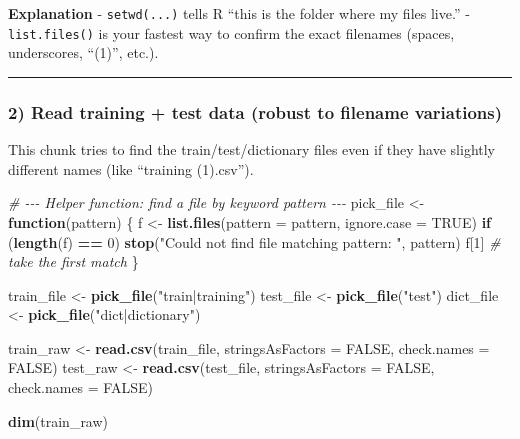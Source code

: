 \documentclass[
]{article}
\newenvironment{Shaded}{\begin{snugshade}}{\end{snugshade}}
\newcommand{\AttributeTok}[1]{\textcolor[rgb]{0.13,0.29,0.53}{#1}}
\newcommand{\CommentTok}[1]{\textcolor[rgb]{0.56,0.35,0.01}{\textit{#1}}}
\newcommand{\ConstantTok}[1]{\textcolor[rgb]{0.56,0.35,0.01}{#1}}
\newcommand{\ControlFlowTok}[1]{\textcolor[rgb]{0.13,0.29,0.53}{\textbf{#1}}}
\newcommand{\DecValTok}[1]{\textcolor[rgb]{0.00,0.00,0.81}{#1}}
\newcommand{\FunctionTok}[1]{\textcolor[rgb]{0.13,0.29,0.53}{\textbf{#1}}}
\newcommand{\NormalTok}[1]{#1}
\newcommand{\OtherTok}[1]{\textcolor[rgb]{0.56,0.35,0.01}{#1}}
\newcommand{\SpecialCharTok}[1]{\textcolor[rgb]{0.81,0.36,0.00}{\textbf{#1}}}
\newcommand{\StringTok}[1]{\textcolor[rgb]{0.31,0.60,0.02}{#1}}
\begin{document}
\textbf{Explanation} - \texttt{setwd(...)} tells R ``this is the folder
where my files live.'' - \texttt{list.files()} is your fastest way to
confirm the exact filenames (spaces, underscores, ``(1)'', etc.).

\begin{center}\rule{0.5\linewidth}{0.5pt}\end{center}

\subsubsection{2) Read training + test data (robust to filename
variations)}\label{read-training-test-data-robust-to-filename-variations}

This chunk tries to find the train/test/dictionary files even if they
have slightly different names (like ``training (1).csv'').

\begin{Shaded}
\begin{Highlighting}[]
\CommentTok{\# {-}{-}{-} Helper function: find a file by keyword pattern {-}{-}{-}}
\NormalTok{pick\_file }\OtherTok{\textless{}{-}} \ControlFlowTok{function}\NormalTok{(pattern) \{}
\NormalTok{  f }\OtherTok{\textless{}{-}} \FunctionTok{list.files}\NormalTok{(}\AttributeTok{pattern =}\NormalTok{ pattern, }\AttributeTok{ignore.case =} \ConstantTok{TRUE}\NormalTok{)}
  \ControlFlowTok{if}\NormalTok{ (}\FunctionTok{length}\NormalTok{(f) }\SpecialCharTok{==} \DecValTok{0}\NormalTok{) }\FunctionTok{stop}\NormalTok{(}\StringTok{"Could not find file matching pattern: "}\NormalTok{, pattern)}
\NormalTok{  f[}\DecValTok{1}\NormalTok{]  }\CommentTok{\# take the first match}
\NormalTok{\}}

\NormalTok{train\_file }\OtherTok{\textless{}{-}} \FunctionTok{pick\_file}\NormalTok{(}\StringTok{"train|training"}\NormalTok{)}
\NormalTok{test\_file  }\OtherTok{\textless{}{-}} \FunctionTok{pick\_file}\NormalTok{(}\StringTok{"test"}\NormalTok{)}
\NormalTok{dict\_file  }\OtherTok{\textless{}{-}} \FunctionTok{pick\_file}\NormalTok{(}\StringTok{"dict|dictionary"}\NormalTok{)}

\NormalTok{train\_raw }\OtherTok{\textless{}{-}} \FunctionTok{read.csv}\NormalTok{(train\_file, }\AttributeTok{stringsAsFactors =} \ConstantTok{FALSE}\NormalTok{, }\AttributeTok{check.names =} \ConstantTok{FALSE}\NormalTok{)}
\NormalTok{test\_raw  }\OtherTok{\textless{}{-}} \FunctionTok{read.csv}\NormalTok{(test\_file,  }\AttributeTok{stringsAsFactors =} \ConstantTok{FALSE}\NormalTok{, }\AttributeTok{check.names =} \ConstantTok{FALSE}\NormalTok{)}

\FunctionTok{dim}\NormalTok{(train\_raw)}
\end{Highlighting}
\end{Shaded}
\end{document}
